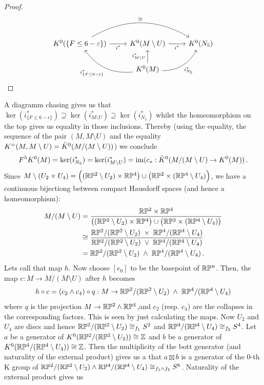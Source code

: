 \begin{proof}
\begin{equation}
\begin{tikzcd}
K^0(\{F \leq 6-\epsilon\}) \arrow[r, "i^*"'] \arrow[rr, "\cong", bend left] & K^0(M \setminus U) \arrow[r, "i^*"']                                                                                             & K^0(N_5) \\
                                                                            & K^0(M) \arrow[lu, "i_{\{F \leq 6-\epsilon\}}^*", bend left] \arrow[ru, "i_{N_5}^*"', bend right] \arrow[u, "i_{M\setminus U}^*"] &         
\end{tikzcd}
		 \end{equation}
	\end{proof}
	 A diagramm chasing gives us that $\ker(i_{\{F \leq 6-\epsilon\}}^*)\supseteq \ker(i_{M\setminus U}^*)\supseteq \ker(i_{N_5}^*)$ whilst the homeomorphism on the top gives us equality in those inclusions.
	  Thereby (using the equality, the sequence of the pair $(M,M\setminus U)$ and the equality $K^=(M,M\setminus U)=\tilde{K}^0(M/(M\setminus U))$) we conclude
	 \begin{equation}\label{eq:examplesEMinftyIsFn-1}
		F^5K^0(M)=\ker(i_{N_5}^*)=\ker(i_{M\setminus U}^*)=\mathrm{im}(c_*:\tilde{K}^0(M/(M\setminus U)\to K^0(M))\,.
	 \end{equation}
	Since $M\setminus (U_2\times U_4)=\Big((\mathbb{R}\mathbb{P}^2\setminus U_2)\times \mathbb{R}\mathbb{P}^4 \big)\cup \big(\mathbb{R}\mathbb{P}^2\times  (\mathbb{R}\mathbb{P}^4\setminus U_4)\Big)$, we have a continuous bijectiong between compact Hausdorff spaces (and hence a homeomorphism):
		\begin{align*}
		M/(M\setminus U)
		&=\frac{\mathbb{R}\mathbb{P}^2\times\mathbb{R}\mathbb{P}^4}{\big((\mathbb{R}\mathbb{P}^2\setminus U_2)\times \mathbb{R}\mathbb{P}^4\big)\cup\big(\mathbb{R}\mathbb{P}^2\times(\mathbb{R}\mathbb{P}^4\setminus U_4)\big)}\\
		&\cong \frac{\mathbb{R}\mathbb{P}^2/(\mathbb{R}\mathbb{P}^2\setminus U_2)\;\times\;\mathbb{R}\mathbb{P}^4/(\mathbb{R}\mathbb{P}^4\setminus U_4)}{\mathbb{R}\mathbb{P}^2/(\mathbb{R}\mathbb{P}^2\setminus U_2)\;\vee\;\mathbb{R}\mathbb{P}^4/(\mathbb{R}\mathbb{P}^4\setminus U_4)} \\
		&=\mathbb{R}\mathbb{P}^2 /  (\mathbb{R}\mathbb{P}^2\setminus U_2) \;\wedge \; \mathbb{R}\mathbb{P}^4/(\mathbb{R}\mathbb{P}^4\setminus U_4)\,.
	\end{align*} Lets call that map $h$. Now choose $[e_0]$ to be the basepoint of $\mathbb{R}\mathbb{P}^n$. Then, the map $c:M\to M/(M\setminus U)$ after $h$ becomes
	\begin{equation*}
		h\circ c=(c_2\wedge c_4)\circ q:M\to \mathbb{R}\mathbb{P}^2 /  (\mathbb{R}\mathbb{P}^2\setminus U_2) \;\wedge \; \mathbb{R}\mathbb{P}^4/(\mathbb{R}\mathbb{P}^4\setminus U_4)
	\end{equation*} where $q$ is the projection $M\to \mathbb{R}\mathbb{P}^2\wedge \mathbb{R}\mathbb{P}^4$,and $c_2$ (resp. $c_4$) are the collapses in the corresponding factors. This is seen by just calculating the maps. Now $U_2$ and $U_4$ are discs and hence $\mathbb{R}\mathbb{P}^2 / (\mathbb{R}\mathbb{P}^2\setminus U_2)\cong_{f_1} S^2$ and $\mathbb{R}\mathbb{P}^4/(\mathbb{R}\mathbb{P}^4\setminus U_4)\cong_{f_2} S^4$. Let $a$ be a generator of $K^0(\mathbb{R}\mathbb{P}^2 / (\mathbb{R}\mathbb{P}^2\setminus U_2))\cong \mathbb{Z}$ and $b$ be a generator of $K^0(\mathbb{R}\mathbb{P}^4/(\mathbb{R}\mathbb{P}^4\setminus U_4))\cong \mathbb{Z}$. Then the multiplicity of the bott generator (and naturality of the external product) gives us a that $a\boxtimes b$ is a generator of the $0$-th K group of $\mathbb{R}\mathbb{P}^2 / (\mathbb{R}\mathbb{P}^2\setminus U_2)\wedge \mathbb{R}\mathbb{P}^4/(\mathbb{R}\mathbb{P}^4\setminus U_4)\cong_{f_1\wedge f_2} S^6$. Naturality of the external product gives us
